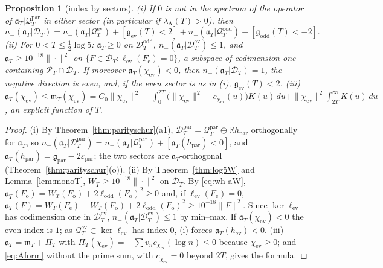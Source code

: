 \documentclass[11pt]{amsart}
\newtheorem{proposition}[theorem]{Proposition}
\theoremstyle{definition}
\theoremstyle{remark}
\newcommand{\R}{\mathbb R}
\newcommand{\PT}{\mathcal P_T}
\newcommand{\lamA}{\lambda_{\mathrm A}(T)}
\newcommand{\PiT}{\Pi_T}
\newcommand{\mT}{\mathfrak m_T}
\begin{document}
\begin{proposition}[index by sectors]\label{prop:wh-index}
\emph{(i)} If $0$ is not in the spectrum of the operator of $\mathfrak a_T|\mathcal Q^{\mathrm{par}}_T$ in either sector (in
particular if $\lamA>0$), then
\[
n_-(\mathfrak a_T|\mathcal D_T)=n_-(\mathfrak a_T|\mathcal Q^{\mathrm{ev}}_T)+[\mathfrak g_{\mathrm{ev}}(T)<2]+n_-(\mathfrak a_T|\mathcal Q^{\mathrm{odd}}_T)+[\mathfrak g_{\mathrm{odd}}(T)<-2].
\]
\emph{(ii)} For $0<T\le\frac12\log5$: $\mathfrak a_T\ge0$ on $\mathcal D^{\mathrm{odd}}_T$, $n_-(\mathfrak a_T|\mathcal D^{\mathrm{ev}}_T)\le1$, and
$\mathfrak a_T\ge10^{-18}\|\cdot\|^2$ on $\{F\in\mathcal D_T:\ell_{\mathrm{ev}}(F_{\mathrm e})=0\}$, a subspace of codimension one
containing $\PT\cap\mathcal D_T$. If moreover $\mathfrak a_T(\chi_{\mathrm{ev}})<0$, then $n_-(\mathfrak a_T|\mathcal D_T)=1$, the negative
direction is even, and, if the even sector is as in (i), $\mathfrak g_{\mathrm{ev}}(T)<2$.
\emph{(iii)} $\mathfrak a_T(\chi_{\mathrm{ev}})\le\mT(\chi_{\mathrm{ev}})=C_0\|\chi_{\mathrm{ev}}\|^2+\int_0^{2T}\big(\|\chi_{\mathrm{ev}}\|^2-c_{\chi_{\mathrm{ev}}}(u)\big)K(u)\,du+\|\chi_{\mathrm{ev}}\|^2\int_{2T}^\infty K(u)\,du$,
an explicit function of $T$.
\end{proposition}

\begin{proof}
(i) By Theorem~\ref{thm:parityschur}(a1), $\mathcal D^{\mathrm{par}}_T=\mathcal Q^{\mathrm{par}}_T\oplus\R h_{\mathrm{par}}$ orthogonally for
$\mathfrak a_T$, so $n_-(\mathfrak a_T|\mathcal D^{\mathrm{par}}_T)=n_-(\mathfrak a_T|\mathcal Q^{\mathrm{par}}_T)+[\mathfrak a_T(h_{\mathrm{par}})<0]$, and
$\mathfrak a_T(h_{\mathrm{par}})=\mathfrak g_{\mathrm{par}}-2\varepsilon_{\mathrm{par}}$; the two sectors are $\mathfrak a_T$-orthogonal
(Theorem~\ref{thm:parityschur}(o)). (ii) By Theorem~\ref{thm:log5W} and Lemma~\ref{lem:monoT},
$W_T\ge10^{-18}\|\cdot\|^2$ on $\mathcal D_T$. By \eqref{eq:wh-aW}, $\mathfrak a_T(F_{\mathrm o})=W_T(F_{\mathrm o})+2\ell_{\mathrm{odd}}(F_{\mathrm o})^2\ge0$
and, if $\ell_{\mathrm{ev}}(F_{\mathrm e})=0$, $\mathfrak a_T(F)=W_T(F_{\mathrm e})+W_T(F_{\mathrm o})+2\ell_{\mathrm{odd}}(F_{\mathrm o})^2\ge10^{-18}\|F\|^2$. Since
$\ker\ell_{\mathrm{ev}}$ has codimension one in $\mathcal D^{\mathrm{ev}}_T$, $n_-(\mathfrak a_T|\mathcal D^{\mathrm{ev}}_T)\le1$ by min--max. If
$\mathfrak a_T(\chi_{\mathrm{ev}})<0$ the even index is $1$; as $\mathcal Q^{\mathrm{ev}}_T\subset\ker\ell_{\mathrm{ev}}$ has index $0$, (i) forces
$\mathfrak a_T(h_{\mathrm{ev}})<0$. (iii) $\mathfrak a_T=\mT+\PiT$ with $\PiT(\chi_{\mathrm{ev}})=-\sum v_nc_{\chi_{\mathrm{ev}}}(\log n)\le0$ because
$\chi_{\mathrm{ev}}\ge0$; and \eqref{eq:Aform} without the prime sum, with $c_{\chi_{\mathrm{ev}}}=0$ beyond $2T$, gives the formula.
\end{proof}
\end{document}
